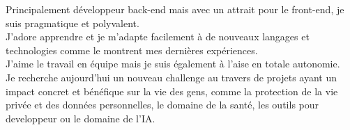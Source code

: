 \documentclass[8pt]{developercv} %
\begin{document}
\vfill %

\begin{minipage}[t]{0.51\textwidth} %
    \vspace{-0.5\baselineskip} %

    Principalement développeur back-end mais avec un attrait pour le front-end, je suis pragmatique et polyvalent.\\
    J'adore apprendre et je m'adapte facilement à de nouveaux langages et technologies comme le montrent mes dernières expériences.\\
    J'aime le travail en équipe mais je suis également à l'aise en totale autonomie.\\

    Je recherche aujourd'hui un nouveau challenge au travers de projets ayant un impact concret et bénéfique sur la vie des gens, comme la protection de la vie privée et des données personnelles, le domaine de la santé, les outils pour developpeur ou le domaine de l'IA.
\end{minipage}
\hfill %
\begin{minipage}[t]{0.45\textwidth} %
    \vspace{-1.5\baselineskip} %
    \begin{barchart}{5.5}
    \end{barchart}
\end{minipage}

\vfill %
\end{document}
